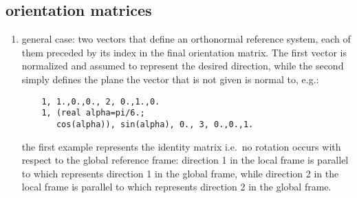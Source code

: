 \subsection{ orientation matrices}
\begin{enumerate}
    \item general case: two vectors that define an orthonormal reference
    system, each of them preceded by its index in the final orientation 
    matrix. The first vector is normalized and assumed to represent the
    desired direction, while the second simply defines the plane the
    vector that is not given is normal to, e.g.:
    \begin{verbatim}
    1, 1.,0.,0., 2, 0.,1.,0.
    1, (real alpha=pi/6.; 
       cos(alpha)), sin(alpha), 0., 3, 0.,0.,1.
    \end{verbatim}
    the first example represents the identity matrix i.e.\ no rotation 
    occurs with respect to the global reference frame: direction 1
    in the local frame is parallel to  which represents
    direction 1 in the global frame, while direction 2 in the local frame
    is parallel to  which represents direction 2
    in the global frame.


\end{enumerate}
